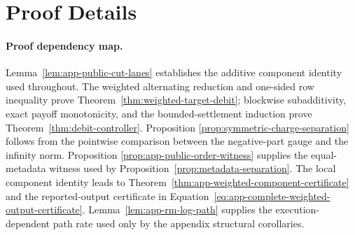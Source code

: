 \section{Proof Details}
\label{app:proofs}

\paragraph{Proof dependency map.}
Lemma~\ref{lem:app-public-cut-lanes} establishes the additive component
identity used throughout.  The weighted alternating reduction and one-sided
row inequality prove Theorem~\ref{thm:weighted-target-debit}; blockwise
subadditivity, exact payoff monotonicity, and the bounded-settlement induction
prove
Theorem~\ref{thm:debit-controller}.  Proposition
\ref{prop:symmetric-charge-separation} follows from the pointwise comparison
between the negative-part gauge and the infinity norm.  Proposition
\ref{prop:app-public-order-witness} supplies the equal-metadata witness used by
Proposition~\ref{prop:metadata-separation}.  The local component identity leads
to Theorem~\ref{thm:app-weighted-component-certificate} and the reported-output
certificate in Equation~\ref{eq:app-complete-weighted-output-certificate}.
Lemma~\ref{lem:app-rm-log-path} supplies the execution-dependent path rate used
only by the appendix structural corollaries.

